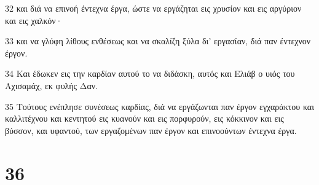 \par 32 και διά να επινοή έντεχνα έργα, ώστε να εργάζηται εις χρυσίον και εις αργύριον και εις χαλκόν·
\par 33 και να γλύφη λίθους ενθέσεως και να σκαλίζη ξύλα δι' εργασίαν, διά παν έντεχνον έργον.
\par 34 Και έδωκεν εις την καρδίαν αυτού το να διδάσκη, αυτός και Ελιάβ ο υιός του Αχισαμάχ, εκ φυλής Δαν.
\par 35 Τούτους ενέπλησε συνέσεως καρδίας, διά να εργάζωνται παν έργον εγχαράκτου και καλλιτέχνου και κεντητού εις κυανούν και εις πορφυρούν, εις κόκκινον και εις βύσσον, και υφαντού, των εργαζομένων παν έργον και επινοούντων έντεχνα έργα.

\chapter{36}

